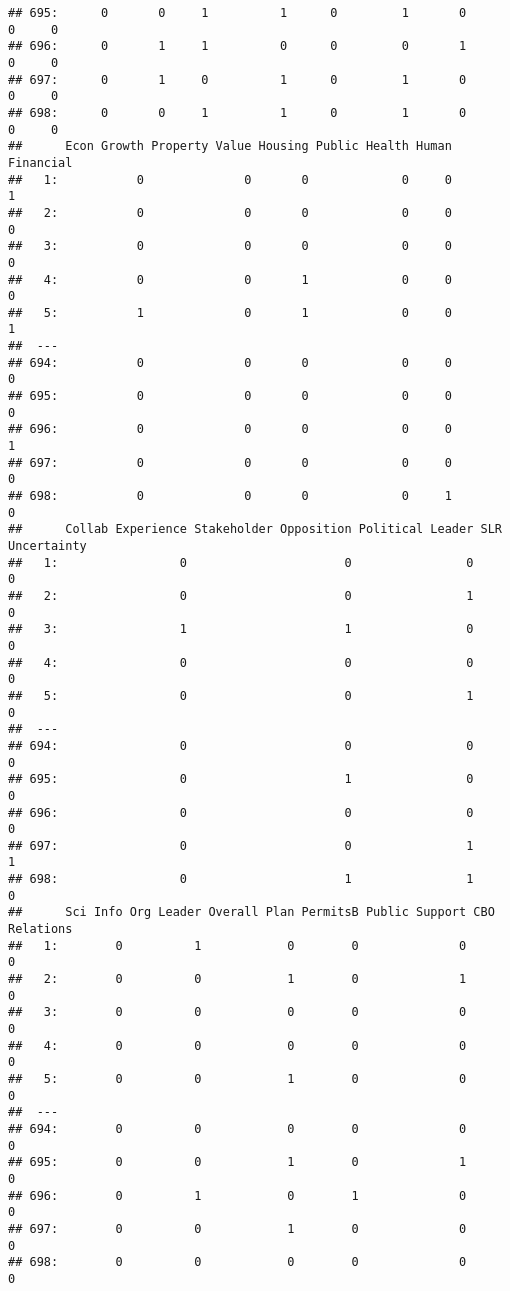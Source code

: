 \documentclass[
]{article}
\begin{document}
\begin{verbatim}
## 695:      0       0     1          1      0         1       0          0     0
## 696:      0       1     1          0      0         0       1          0     0
## 697:      0       1     0          1      0         1       0          0     0
## 698:      0       0     1          1      0         1       0          0     0
##      Econ Growth Property Value Housing Public Health Human Financial
##   1:           0              0       0             0     0         1
##   2:           0              0       0             0     0         0
##   3:           0              0       0             0     0         0
##   4:           0              0       1             0     0         0
##   5:           1              0       1             0     0         1
##  ---                                                                 
## 694:           0              0       0             0     0         0
## 695:           0              0       0             0     0         0
## 696:           0              0       0             0     0         1
## 697:           0              0       0             0     0         0
## 698:           0              0       0             0     1         0
##      Collab Experience Stakeholder Opposition Political Leader SLR Uncertainty
##   1:                 0                      0                0               0
##   2:                 0                      0                1               0
##   3:                 1                      1                0               0
##   4:                 0                      0                0               0
##   5:                 0                      0                1               0
##  ---                                                                          
## 694:                 0                      0                0               0
## 695:                 0                      1                0               0
## 696:                 0                      0                0               0
## 697:                 0                      0                1               1
## 698:                 0                      1                1               0
##      Sci Info Org Leader Overall Plan PermitsB Public Support CBO Relations
##   1:        0          1            0        0              0             0
##   2:        0          0            1        0              1             0
##   3:        0          0            0        0              0             0
##   4:        0          0            0        0              0             0
##   5:        0          0            1        0              0             0
##  ---                                                                       
## 694:        0          0            0        0              0             0
## 695:        0          0            1        0              1             0
## 696:        0          1            0        1              0             0
## 697:        0          0            1        0              0             0
## 698:        0          0            0        0              0             0
\end{verbatim}
\end{document}
